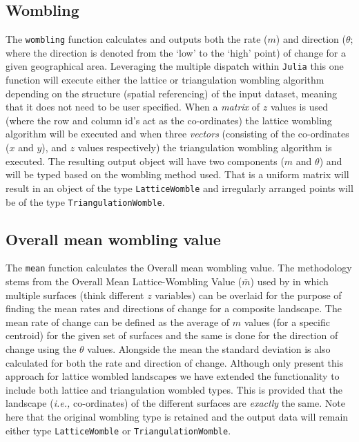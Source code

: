 \subsection{Wombling}\label{wombling}

The \texttt{wombling} function calculates and outputs both the rate
(\(m\)) and direction (\(\theta\); where the direction is denoted from
the `low' to the `high' point) of change for a given geographical area.
Leveraging the multiple dispatch within \texttt{Julia} this one function
will execute either the lattice or triangulation wombling algorithm
depending on the structure (spatial referencing) of the input dataset,
meaning that it does not need to be user specified. When a \emph{matrix}
of \(z\) values is used (where the row and column id's act as the
co-ordinates) the lattice wombling algorithm will be executed and when
three \emph{vectors} (consisting of the co-ordinates (\(x\) and \(y\)),
and \(z\) values respectively) the triangulation wombling algorithm is
executed. The resulting output object will have two components (\(m\)
and \(\theta\)) and will be typed based on the wombling method used.
That is a uniform matrix will result in an object of the type
\texttt{LatticeWomble} and irregularly arranged points will be of the
type \texttt{TriangulationWomble}.

\subsection{Overall mean wombling
value}\label{overall-mean-wombling-value}

The \texttt{mean} function calculates the Overall mean wombling value.
The methodology stems from the Overall Mean Lattice-Wombling Value
(\(\bar{m}\)) used by \cite{Fortin1994EdgDet} in which multiple surfaces
(think different \(z\) variables) can be overlaid for the purpose of
finding the mean rates and directions of change for a composite
landscape. The mean rate of change can be defined as the average of
\(m\) values (for a specific centroid) for the given set of surfaces and
the same is done for the direction of change using the \(\theta\)
values. Alongside the mean the standard deviation is also calculated for
both the rate and direction of change. Although \cite{Fortin1994EdgDet} only
present this approach for lattice wombled landscapes we have extended
the functionality to include both lattice and triangulation wombled
types. This is provided that the landscape (\emph{i.e.,} co-ordinates) of
the different surfaces are \emph{exactly} the same. Note here that the
original wombling type is retained and the output data will remain
either type \texttt{LatticeWomble} or \texttt{TriangulationWomble}.

